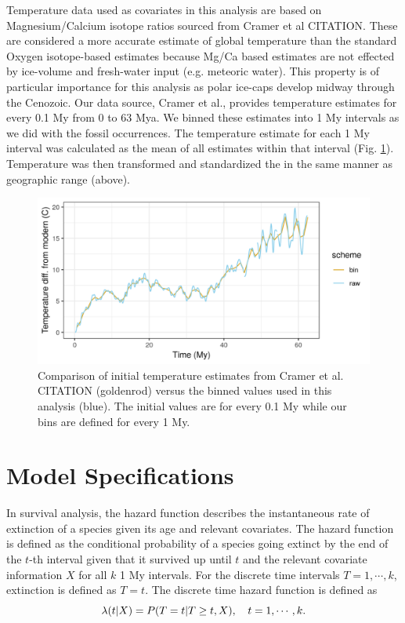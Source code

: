 \documentclass[12pt,letterpaper]{article}
\begin{document}
Temperature data used as covariates in this analysis are based on Magnesium/Calcium isotope ratios sourced from Cramer et al CITATION. These are considered a more accurate estimate of global temperature than the standard Oxygen isotope-based estimates because Mg/Ca based estimates are not effected by ice-volume and fresh-water input (e.g. meteoric water). This property is of particular importance for this analysis as polar ice-caps develop midway through the Cenozoic. Our data source, Cramer et al., provides temperature estimates for every 0.1 My from 0 to 63 Mya. We binned these estimates into 1 My intervals as we did with the fossil occurrences. The temperature estimate for each 1 My interval was calculated as the mean of all estimates within that interval (Fig. \ref{fig:temp_curve}). Temperature was then transformed and standardized the in the same manner as geographic range (above).

\begin{figure}[ht]
  \centering
  \includegraphics[width=\textwidth,height=0.5\textheight,keepaspectratio=true]{../results/figure/cramer_temp}
  \caption{Comparison of initial temperature estimates from Cramer et al. CITATION (goldenrod) versus the binned values used in this analysis (blue). The initial values are for every 0.1 My while our bins are defined for every 1 My.}
  \label{fig:temp_curve}
\end{figure}


\section{Model Specifications}

In survival analysis, the hazard function describes the instantaneous rate of extinction of a species given its age and relevant covariates. The hazard function is defined as the conditional probability of a species going extinct by the end of the \(t\)-th interval given that it survived up until \(t\) and the relevant covariate information \(X\) for all \(k\) 1 My intervals. For the discrete time intervals \(T = 1, \cdots, k\), extinction is defined as \(T = t\). The discrete time hazard function is defined as
\begin{equation}
  \lambda(t | X) = P(T = t | T \geq t, X), \quad t = 1, \cdots, k. \\
  \label{eq:hazard}
\end{equation}
\end{document}
